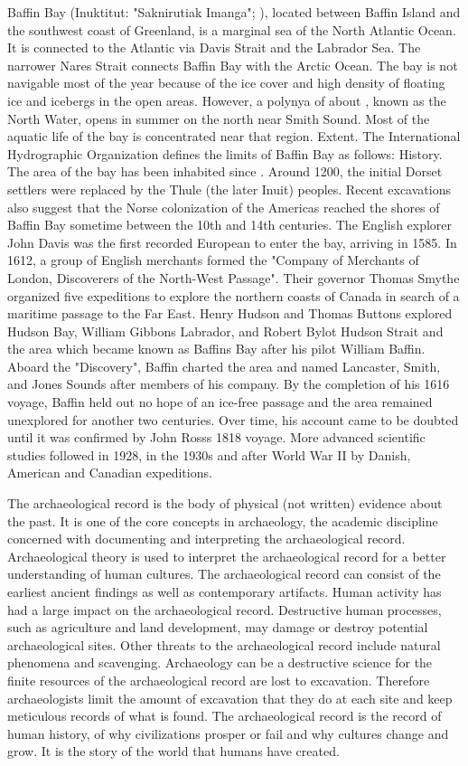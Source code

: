 \documentclass{article} \usepackage{iclr2019_conference,times}
\begin{document}
Baffin Bay (Inuktitut: "Saknirutiak Imanga"; ), located between Baffin Island and the southwest coast of Greenland, is a marginal sea of the North Atlantic Ocean. It is connected to the Atlantic via Davis Strait and the Labrador Sea. The narrower Nares Strait connects Baffin Bay with the Arctic Ocean. The bay is not navigable most of the year because of the ice cover and high density of floating ice and icebergs in the open areas. However, a polynya of about , known as the North Water, opens in summer on the north near Smith Sound. Most of the aquatic life of the bay is concentrated near that region.
Extent.
The International Hydrographic Organization defines the limits of Baffin Bay as follows:
History.
The area of the bay has been inhabited since  . Around  1200, the initial Dorset settlers were replaced by the Thule (the later Inuit) peoples. Recent excavations also suggest that the Norse colonization of the Americas reached the shores of Baffin Bay sometime between the 10th and 14th centuries. The English explorer John Davis was the first recorded European to enter the bay, arriving in 1585. In 1612, a group of English merchants formed the "Company of Merchants of London, Discoverers of the North-West Passage". Their governor Thomas Smythe organized five expeditions to explore the northern coasts of Canada in search of a maritime passage to the Far East. Henry Hudson and Thomas Buttons explored Hudson Bay, William Gibbons Labrador, and Robert Bylot Hudson Strait and the area which became known as Baffins Bay after his pilot William Baffin. Aboard the "Discovery", Baffin charted the area and named Lancaster, Smith, and Jones Sounds after members of his company. By the completion of his 1616 voyage, Baffin held out no hope of an ice-free passage and the area remained unexplored for another two centuries. Over time, his account came to be doubted until it was confirmed by John Rosss 1818 voyage. More advanced scientific studies followed in 1928, in the 1930s and after World War II by Danish, American and Canadian expeditions.

The archaeological record is the body of physical (not written) evidence about the past. It is one of the core concepts in archaeology, the academic discipline concerned with documenting and interpreting the archaeological record. Archaeological theory is used to interpret the archaeological record for a better understanding of human cultures. The archaeological record can consist of the earliest ancient findings as well as contemporary artifacts. Human activity has had a large impact on the archaeological record. Destructive human processes, such as agriculture and land development, may damage or destroy potential archaeological sites. Other threats to the archaeological record include natural phenomena and scavenging. Archaeology can be a destructive science for the finite resources of the archaeological record are lost to excavation. Therefore archaeologists limit the amount of excavation that they do at each site and keep meticulous records of what is found. The archaeological record is the record of human history, of why civilizations prosper or fail and why cultures change and grow. It is the story of the world that humans have created.
\end{document}
